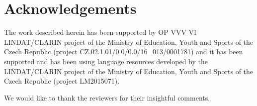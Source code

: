 \documentclass[11pt,a4paper]{article}
\begin{document}
\section*{Acknowledgements}

The work described herein has been supported by OP VVV VI LINDAT/CLARIN project
of the Ministry of Education, Youth and Sports of the Czech Republic (project
CZ.02.1.01/0.0/0.0/16\_013/0001781) and it has been supported and has been
using language resources developed by the LINDAT/CLARIN project of the Ministry
of Education, Youth and Sports of the Czech Republic (project LM2015071).

We would like to thank the reviewers for their insightful comments.  



\end{document}
